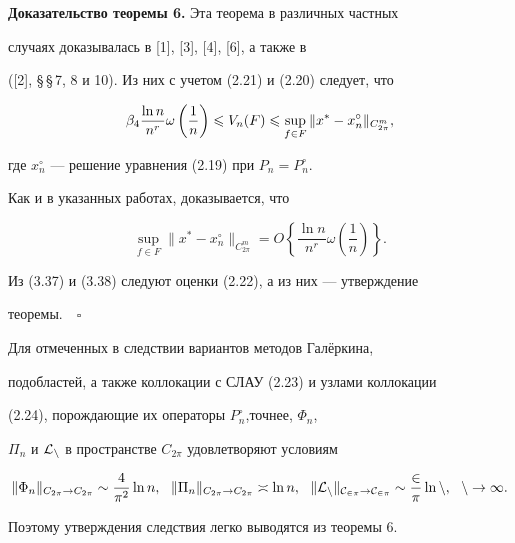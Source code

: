 \medskip





{\bf Доказательство теоремы 6.} Эта теорема в различных частных


случаях доказывалась в [1], [3], [4], [6], а также в


([2], \S\,\S\,7, 8 и 10). Из них с учетом (2.21) и (2.20) следует, что


\begin{equation}


\beta_4 \frac{\ln n}{n^r}\omega\left(\frac{1}{n}\right)\lea


V_n(F)\lea \sup\limits_{f\in F}\|x^*-x_n^\circ\|_{C_{2\pi}^m},


\end{equation}


где $x_n^\circ$ --- решение уравнения (2.19) при $P_n = P_n^\circ$.


Как и в указанных работах, доказывается, что


\begin{equation}


\sup\limits_{f\in F}\|x^* - x_n^\circ\|_{C_{2\pi}^m} = O\left\{


\frac{\ln n}{n^r}\omega\left(\frac{1}{n}\right)\right\}.


\end{equation}


Из (3.37) и (3.38) следуют оценки (2.22), а из них --- утверждение


теоремы.$\quad\square$





Для отмеченных в следствии вариантов методов Гал\"еркина,


подобластей, а также коллокации с СЛАУ (2.23) и узлами коллокации


(2.24), порождающие их операторы $P_n^\circ$,точнее, $\Phi_n$,


$\Pi_n$ и $\cal{L}_n$ в пространстве $C_{2\pi}$ удовлетворяют условиям


$$


\|\Phi_n\|_{C_{2\pi}\to C_{2\pi}}\sim \frac{4}{\pi^2}\ln n,\ \


\|\Pi_n\|_{C_{2\pi}\to C_{2\pi}}\asymp \ln n,\ \


\|\rL_n\|_{C_{2\pi}\to C_{2\pi}}\sim \frac{2}{\pi}\ln n,\ \ n\to


\infty.


$$


Поэтому утверждения следствия легко выводятся из теоремы 6.





